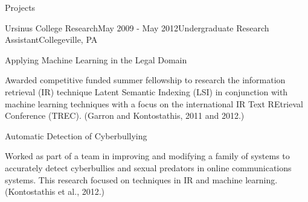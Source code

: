 \documentclass{resume} %
\begin{document}
\begin{rSection}{Projects}

\begin{rSubsection}{Ursinus College Research}{May 2009 - May 2012}{Undergraduate Research Assistant}{Collegeville, PA}
\item
\begin{rWorkProject}{Applying Machine Learning in the Legal Domain}
\item Awarded competitive funded summer fellowship to research the information retrieval (IR) technique Latent Semantic Indexing (LSI) in conjunction with machine learning techniques with a focus on the international IR Text REtrieval Conference (TREC). (Garron and Kontostathis, 2011 and 2012.)
\end{rWorkProject}
\item
\begin{rWorkProject}{Automatic Detection of Cyberbullying}
\item Worked as part of a team in improving and modifying a family of systems to accurately detect cyberbullies and sexual predators in online communications systems. This research focused on techniques in IR and
machine learning. (Kontostathis et al., 2012.)
\end{rWorkProject}
\end{rSubsection}
\end{rSection}
\end{document}
